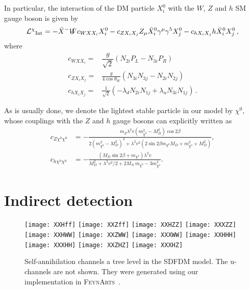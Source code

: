 %
In particular, the interaction of the DM particle $X_i^0$ with the $W$, $Z$ and $h$ SM gauge boson is given by~\cite{Abdallah:2015ter}
%
\begin{align}
\mathcal{L^{\chi}}_{\text{Int}}=-\bar{X}^-\slashed{W}c_{WXX_i}X_i^0
-c_{ZX_iX_j}Z_{\mu}\bar{X}_i^0\gamma^{\mu}\gamma^{5}X_j^0
-c_{hX_iX_j}h\bar{X}_i^0X_j^0 \,,
\end{align}
where 
\begin{align}
c_{WXX_i}=& \dfrac{g}{\sqrt{2}}\left(N_{2i}P_L-N_{3i}P_R\right)  \label{eq:cWXXi}\\
c_{ZX_iX_j}=&\frac{g}{4\cos\theta_W}(N_{3i}N_{3j}-N_{2i}N_{2j}) \label{eq:cZXiXj}\\
c_{hX_iX_j}=&\frac{1}{\sqrt{2}}(-\lambda_dN_{2i}N_{1j}+\lambda_uN_{3i}N_{1j})\label{eq:cHXiXj}\,.
\end{align}
 
As is usually done, we denote the lightest stable particle in our model by $\chi^0$, whose couplings with the $Z$ and $h$ gauge bosons can explicitly written as~\cite{Calibbi:2015nha}
\begin{align}
c_{Z\chi^0\chi^0}&=-\frac{m_Z\lambda^2v(m_{\chi^0}^{2}-M_D^2)\cos2\beta}{2(m_{\chi^0}^{2}-M_D^2)^2+\lambda^2v^2\left(2\sin2\beta m_{\chi^0} M_D+m_{\chi^0}^{2}+M_D^2\right)},\label{eq:cZXX}\\
c_{h\chi^0\chi^0}&=-\frac{(M_D\sin 2\beta+m_{\chi^0})\lambda^2v}{M_D^2+\lambda^2v^2/2+2M_N\,m_{\chi^0}-3m_{\chi^0}^{2}}\label{eq:cHXX}.
\end{align}



\section{Indirect detection}


\begin{figure}
\begin{center}
\texttt{[image: XXHff]}
\texttt{[image: XXZff]}
\texttt{[image: XXHZZ]}
\texttt{[image: XXXZZ]}
\texttt{[image: XXHWW]}
\texttt{[image: XXZWW]}
\texttt{[image: XXXWW]}
\texttt{[image: XXHHH]}
\texttt{[image: XXXHH]}
\texttt{[image: XXZHZ]}
\texttt{[image: XXXHZ]}
\end{center}
\caption{Self-annihilation channels a tree level in the SDFDM model. The u-channels are not shown. They were generated using our implementation in \textsc{FeynArts}~\cite{Hahn:2000kx}.}
\label{fig:self-channels}
\end{figure}

